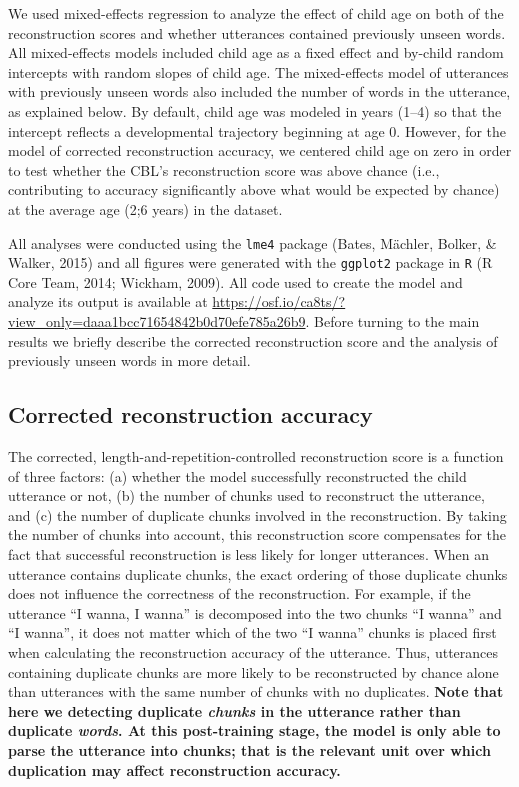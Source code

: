 \documentclass[man,mask,floatsintext]{apa6}
\begin{document}
We used mixed-effects regression to analyze the effect of child age on
both of the reconstruction scores and whether utterances contained
previously unseen words. All mixed-effects models included child age as
a fixed effect and by-child random intercepts with random slopes of
child age. The mixed-effects model of utterances with previously unseen
words also included the number of words in the utterance, as explained
below. By default, child age was modeled in years (1--4) so that the
intercept reflects a developmental trajectory beginning at age 0.
However, for the model of corrected reconstruction accuracy, we centered
child age on zero in order to test whether the CBL's reconstruction
score was above chance (i.e., contributing to accuracy significantly
above what would be expected by chance) at the average age (2;6 years)
in the dataset.

All analyses were conducted using the \texttt{lme4} package (Bates,
Mächler, Bolker, \& Walker, 2015) and all figures were generated with
the \texttt{ggplot2} package in \texttt{R} (R Core Team, 2014; Wickham,
2009). All code used to create the model and analyze its output is
available at
\href{}{https://osf.io/ca8ts/?view\_only=daaa1bcc71654842b0d70efe785a26b9}.
Before turning to the main results we briefly describe the corrected
reconstruction score and the analysis of previously unseen words in more
detail.

\subsection{Corrected reconstruction
accuracy}\label{corrected-reconstruction-accuracy}

The corrected, length-and-repetition-controlled reconstruction score is
a function of three factors: (a) whether the model successfully
reconstructed the child utterance or not, (b) the number of chunks used
to reconstruct the utterance, and (c) the number of duplicate chunks
involved in the reconstruction. By taking the number of chunks into
account, this reconstruction score compensates for the fact that
successful reconstruction is less likely for longer utterances. When an
utterance contains duplicate chunks, the exact ordering of those
duplicate chunks does not influence the correctness of the
reconstruction. For example, if the utterance \enquote{I wanna, I wanna}
is decomposed into the two chunks \enquote{I wanna} and \enquote{I
wanna}, it does not matter which of the two \enquote{I wanna} chunks is
placed first when calculating the reconstruction accuracy of the
utterance. Thus, utterances containing duplicate chunks are more likely
to be reconstructed by chance alone than utterances with the same number
of chunks with no duplicates. \textbf{Note that here we detecting
duplicate \emph{chunks} in the utterance rather than duplicate
\emph{words}. At this post-training stage, the model is only able to
parse the utterance into chunks; that is the relevant unit over which
duplication may affect reconstruction accuracy.}
\end{document}
